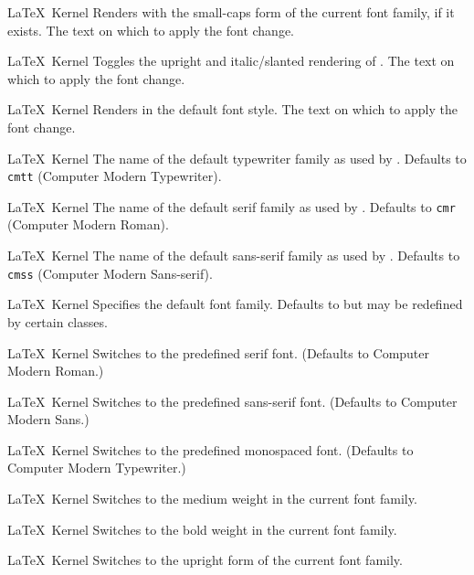 %
 {}%
 {\LaTeX\ Kernel}%
 {Renders  with the small-caps form of the current font family, if it exists.}%
 {%
   \BeginArgList
      The text on which to apply the font change.
   \EndArgList
 }

%
 {}%
 {\LaTeX\ Kernel}%
 {Toggles the upright and italic\slash slanted rendering of .}%
 {%
   \BeginArgList
      The text on which to apply the font change.
   \EndArgList
 }

%
 {}%
 {\LaTeX\ Kernel}%
 {Renders  in the default font style.}%
 {%
   \BeginArgList
      The text on which to apply the font change.
   \EndArgList
 }

%
 {}%
 {\LaTeX\ Kernel}%
 {The name of the default typewriter family as used by . 
  Defaults to \texttt{cmtt} (Computer Modern Typewriter).}%
 {}

%
 {}%
 {\LaTeX\ Kernel}%
 {The name of the default serif family as used by . 
  Defaults to \texttt{cmr} (Computer Modern Roman).}%
 {}

%
 {}%
 {\LaTeX\ Kernel}%
 {The name of the default sans-serif family as used by . 
  Defaults to \texttt{cmss} (Computer Modern Sans-serif).}%
 {}

%
 {}%
 {\LaTeX\ Kernel}%
 {Specifies the default font family. Defaults to
    but may be redefined by certain classes.}%
 {}

%
 {}%
 {\LaTeX\ Kernel}%
 {Switches to the predefined serif font. (Defaults to
  Computer Modern Roman.)}%
 {}

%
 {}%
 {\LaTeX\ Kernel}%
 {Switches to the predefined sans-serif font. (Defaults to
  Computer Modern Sans.)}%
 {}

%
 {}%
 {\LaTeX\ Kernel}%
 {Switches to the predefined monospaced font. (Defaults to
  Computer Modern Typewriter.)}%
 {}

%
 {}%
 {\LaTeX\ Kernel}%
 {Switches to the medium weight in the current font
  family.}%
 {}

%
 {}%
 {\LaTeX\ Kernel}%
 {Switches to the bold weight in the current font
  family.}%
 {}


%
 {}%
 {\LaTeX\ Kernel}%
 {Switches to the upright form of the current font family.}%
 {}

